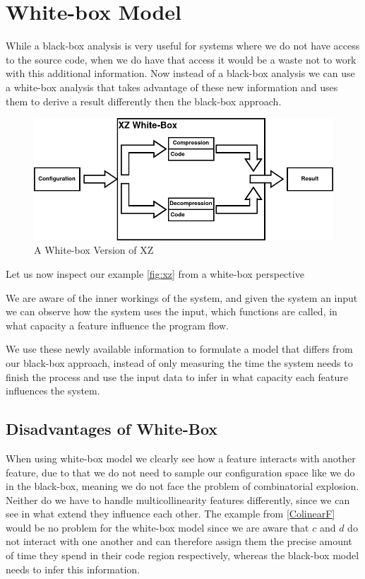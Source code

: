 \section{White-box Model}\label{ch:Whitebox}

While a black-box analysis is very useful for systems where we do not have access to the source code, when we do have that access
it would be a waste not to work with this additional information. Now instead of a black-box analysis we can use a white-box analysis 
that takes advantage of these new information and uses them to derive a result differently then the black-box approach.


\begin{figure}[h]
    \centering
    \includegraphics[scale=0.6]{gfx/XZWhitebox.png}
    \caption{A White-box Version of XZ}
    \label{fig:WBxz}
\end{figure}

Let us now inspect our example \autoref{fig:xz} from a white-box perspective


We are aware of the inner workings of the system, and given the system an input we can observe how the system uses the input, which functions are called, 
in what capacity a feature influence the program flow. 

We use these newly available information to formulate a model that differs from our black-box approach, instead of only measuring the time the system
needs to finish the process and use the input data to infer in what capacity each feature influences the system. 

\subsection{Disadvantages of White-Box}
When using white-box model we clearly see how a feature interacts with another feature, due to that we do not need to sample our configuration space like
we do in the black-box, meaning we do not face the problem of combinatorial explosion. 
Neither do we have to handle multicollinearity features differently, since we can see in what extend they influence each other. 
The example from \ref{ColinearF} would be no problem for the white-box model since we are aware that $c$ and $d$ do not interact with one another and can
therefore assign them the precise amount of time they spend in their code region respectively, whereas the black-box model needs to infer this information.

